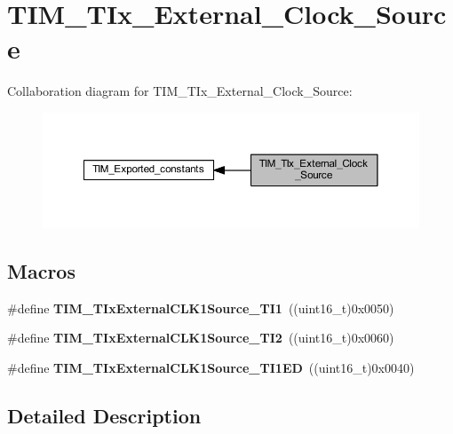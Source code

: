\hypertarget{group___t_i_m___t_ix___external___clock___source}{}\section{T\+I\+M\+\_\+\+T\+Ix\+\_\+\+External\+\_\+\+Clock\+\_\+\+Source}
\label{group___t_i_m___t_ix___external___clock___source}
Collaboration diagram for T\+I\+M\+\_\+\+T\+Ix\+\_\+\+External\+\_\+\+Clock\+\_\+\+Source\+:\nopagebreak
\begin{figure}[H]
\begin{center}
\leavevmode
\includegraphics[width=350pt]{group___t_i_m___t_ix___external___clock___source}
\end{center}
\end{figure}
\subsection*{Macros}
\begin{DoxyCompactItemize}
\item 
\mbox{\label{group___t_i_m___t_ix___external___clock___source_ga237daecde6e1f75509acc80a9ccce820}} 
\#define {\bfseries T\+I\+M\+\_\+\+T\+Ix\+External\+C\+L\+K1\+Source\+\_\+\+T\+I1}~((uint16\+\_\+t)0x0050)
\item 
\mbox{\label{group___t_i_m___t_ix___external___clock___source_gafa3c6345a7e1c3668b2e7e4d61a79491}} 
\#define {\bfseries T\+I\+M\+\_\+\+T\+Ix\+External\+C\+L\+K1\+Source\+\_\+\+T\+I2}~((uint16\+\_\+t)0x0060)
\item 
\mbox{\label{group___t_i_m___t_ix___external___clock___source_gaa1a749bc38d434902b69a45d50ee0889}} 
\#define {\bfseries T\+I\+M\+\_\+\+T\+Ix\+External\+C\+L\+K1\+Source\+\_\+\+T\+I1\+ED}~((uint16\+\_\+t)0x0040)
\end{DoxyCompactItemize}


\subsection{Detailed Description}
